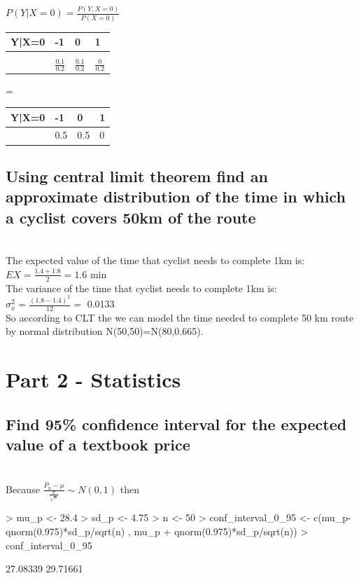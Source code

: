 \documentclass[a4paper]{article}
\begin{document}
\begin{enumerate}[label=\emph{\alph*})]
$P(Y|X=0)=\frac{P(Y,X=0)}{P(X=0)}$
\begin{table}[H]
\begin{center}
  \begin{tabular}{ l | l l l}
    Y|X=0 & -1 & 0 & 1 \\ \hline
      &   &   &   \\
      & $\frac{0.1}{0.2}$ & $\frac{0.1}{0.2}$ & $\frac{0}{0.2}$ \\ 
  \end{tabular}
  \quad
  =
  \quad
  \begin{tabular}{ l | l l l}
    Y|X=0 & -1 & 0 & 1 \\ \hline
      & 0.5 & 0.5 & 0 \\ 
  \end{tabular}
\end{center}
\end{table}
\end{enumerate}

\subsection{Using central limit theorem find an approximate distribution of the time in which a cyclist covers 50km of the route}
\\

The expected value of the time that cyclist needs to complete 1km is:
$EX=\frac{1.4+1.8}{2}=1.6$ min
\\
The variance of the time that cyclist needs to complete 1km is:
$\sigma_{x}^2=\frac{(1.8-1.4)^2}{12}=$ 0.0133 
\\

So according to CLT the we can model the time needed to complete 50 km route by
normal distribution
N(50,50)=N(80,0.665).

\section{Part 2 - Statistics}
\setcounter{subsection}{4}
\subsection{Find 95\% confidence interval for the expected value of a textbook
price}
\\

Because $\frac{\bar{P_n} - \mu}{\frac{\sigma}{\sqrt{n}}}  \sim N(0,1)$ then
\begin{Schunk}
\begin{Sinput}
> mu_p <- 28.4
> sd_p <- 4.75
> n <- 50
> conf_interval_0_95 <- c(mu_p-qnorm(0.975)*sd_p/sqrt(n) , mu_p + qnorm(0.975)*sd_p/sqrt(n))
> conf_interval_0_95
\end{Sinput}
\begin{Soutput}
[1] 27.08339 29.71661
\end{Soutput}
\end{Schunk}
\\
\end{document}
